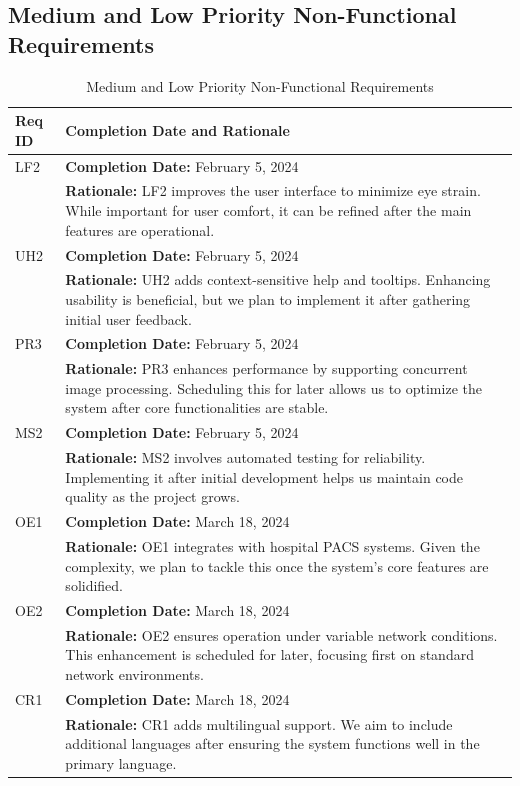 \documentclass[12pt]{article}
\begin{document}
  \subsection{Medium and Low Priority Non-Functional Requirements}
\begin{table}[H]
  \label{TblMediumLowPriorityNFRs}
  \begin{tabular}{p{}|p{}}
  \toprule
  \textbf{Req ID} & \textbf{Completion Date and Rationale} \\
  \midrule
  LF2 & \textbf{Completion Date:} February 5, 2024\\
      & \textbf{Rationale:} LF2 improves the user interface to minimize eye strain. While important for user comfort, it can be refined after the main features are operational. \\
  \midrule
  UH2 & \textbf{Completion Date:} February 5, 2024\\
      & \textbf{Rationale:} UH2 adds context-sensitive help and tooltips. Enhancing usability is beneficial, but we plan to implement it after gathering initial user feedback. \\
  \midrule
  PR3 & \textbf{Completion Date:} February 5, 2024\\
      & \textbf{Rationale:} PR3 enhances performance by supporting concurrent image processing. Scheduling this for later allows us to optimize the system after core functionalities are stable. \\
  \midrule
  MS2 & \textbf{Completion Date:} February 5, 2024\\
      & \textbf{Rationale:} MS2 involves automated testing for reliability. Implementing it after initial development helps us maintain code quality as the project grows. \\
  \midrule
  OE1 & \textbf{Completion Date:} March 18, 2024\\
       & \textbf{Rationale:} OE1 integrates with hospital PACS systems. Given the complexity, we plan to tackle this once the system's core features are solidified. \\
  \midrule
  OE2 & \textbf{Completion Date:} March 18, 2024\\
       & \textbf{Rationale:} OE2 ensures operation under variable network conditions. This enhancement is scheduled for later, focusing first on standard network environments. \\
  \midrule
  CR1 & \textbf{Completion Date:} March 18, 2024\\
       & \textbf{Rationale:} CR1 adds multilingual support. We aim to include additional languages after ensuring the system functions well in the primary language. \\
  \bottomrule
  \end{tabular}
  \caption{Medium and Low Priority Non-Functional Requirements}
  \end{table}
  
\end{document}
